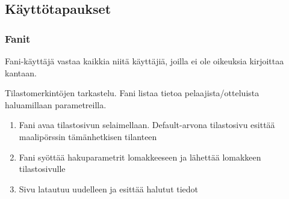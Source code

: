 \documentclass[12pt]{article} %
\begin{document}








\subsection{Käyttötapaukset}
\subsubsection{Fanit}
Fani-käyttäjä vastaa kaikkia niitä käyttäjiä, joilla ei ole oikeuksia kirjoittaa kantaan.
\begin{enumerate}
\begin{item}
Tilastomerkintöjen tarkastelu. Fani listaa tietoa pelaajista/otteluista haluamillaan parametreilla.
	\begin{enumerate}
		\item Fani avaa tilastosivun selaimellaan. Default-arvona tilastosivu esittää maalipörssin tämänhetkisen tilanteen
		\item Fani syöttää hakuparametrit lomakkeeseen ja lähettää lomakkeen tilastosivulle
		\item Sivu latautuu uudelleen ja esittää halutut tiedot
	\end{enumerate}
\end{item}
\end{enumerate}
\end{document}
